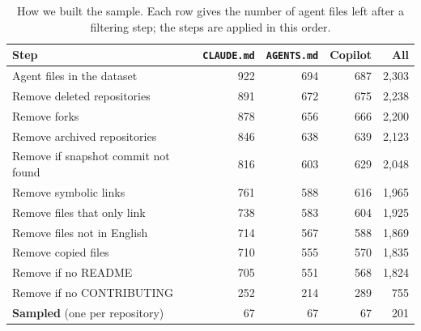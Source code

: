 \begin{table}[t]
\caption{How we built the sample. Each row gives the number of agent files left after a filtering step; the steps are applied in this order.}
\label{tab:flow}
\footnotesize\setlength{\tabcolsep}{3pt}
\begin{tabular}{@{}lrrrr@{}}
\toprule
Step & \texttt{CLAUDE.md} & \texttt{AGENTS.md} & Copilot & All \\
\midrule
Agent files in the dataset & 922 & 694 & 687 & 2{,}303 \\
Remove deleted repositories & 891 & 672 & 675 & 2{,}238 \\
Remove forks & 878 & 656 & 666 & 2{,}200 \\
Remove archived repositories & 846 & 638 & 639 & 2{,}123 \\
Remove if snapshot commit not found & 816 & 603 & 629 & 2{,}048 \\
Remove symbolic links & 761 & 588 & 616 & 1{,}965 \\
Remove files that only link & 738 & 583 & 604 & 1{,}925 \\
Remove files not in English & 714 & 567 & 588 & 1{,}869 \\
Remove copied files & 710 & 555 & 570 & 1{,}835 \\
Remove if no README & 705 & 551 & 568 & 1{,}824 \\
Remove if no CONTRIBUTING & 252 & 214 & 289 & 755 \\
\midrule
\textbf{Sampled} (one per repository) & 67 & 67 & 67 & 201 \\
\bottomrule
\end{tabular}
\end{table}
